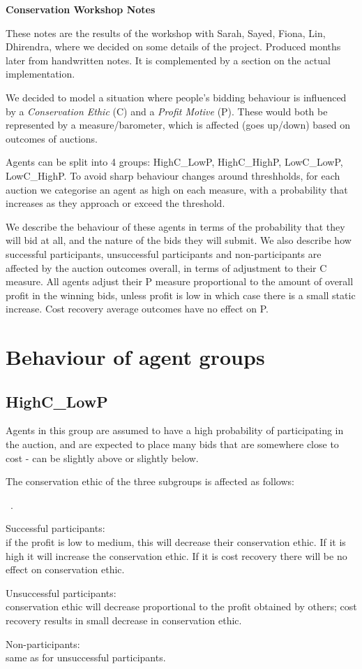 \documentclass{article} %
\newcounter{bean}
\newenvironment{tightenumerate}{
                \begin{list}{
                  {\mbox {
                      \arabic{bean}.\/}}}{\usecounter{bean}
                      \setlength{\itemsep}{-1pt}\setlength{\topsep}{0pt}}}{
                \end{list}}
\begin{document}
\begin{center}
{\Large \bf{Conservation Workshop Notes}}
\end{center}

These notes are the results of the workshop with Sarah, Sayed, Fiona,
Lin, Dhirendra, where we decided on some details of the
project. Produced months later from handwritten notes. It is
complemented by a section on the actual implementation.

We decided to model a situation where people's bidding behaviour is
influenced by a \textit{Conservation Ethic} (C) and a \textit{Profit
  Motive} (P).
These would both be represented by a measure/barometer, which is
affected (goes up/down) based on outcomes of auctions.

Agents can be split into 4 groups: HighC\_LowP, HighC\_HighP, LowC\_LowP,
LowC\_HighP. To avoid sharp behaviour changes around threshholds, for
each auction we categorise an agent as high on each measure, with a
probability that increases as they approach or exceed the threshold.

We describe the behaviour of these agents in terms of the
probability that they will bid at all, and the nature of the bids they
will submit. We also describe how successful participants,
unsuccessful participants and non-participants are affected by the auction
outcomes overall, in terms of adjustment to their C measure. All
agents adjust their P measure proportional to the amount of overall
profit in the winning bids, unless profit is low in which case there
is a small static increase. Cost recovery average outcomes have no
effect on P. 

\section{Behaviour of agent groups}
\subsection{HighC\_LowP}
Agents in this group are assumed to have a high probability of
participating in the auction, and are expected to place many bids that are
somewhere close to cost - can be slightly above or slightly below.

The conservation ethic of the three subgroups is affected as follows:
\begin{tightenumerate}
\item Successful participants:\\
if the profit is low to
medium, this will decrease their conservation ethic. If it is high it
will increase the conservation ethic. If it is cost recovery there
will be no effect on conservation ethic.
\item Unsuccessful participants:\\
conservation ethic will decrease proportional to the profit obtained by
others; cost recovery results in small decrease in conservation ethic.
\item Non-participants:\\
same as for unsuccessful participants.
\end{tightenumerate}
\end{document}
